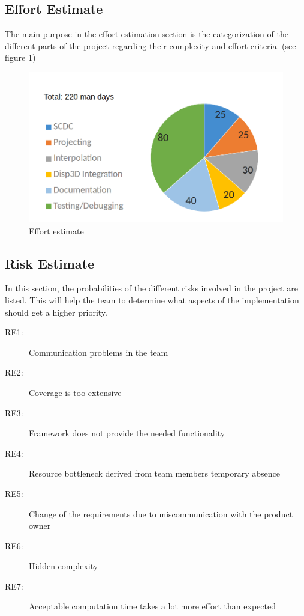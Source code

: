 \newpage

\subsection{Effort Estimate}
The main purpose in the effort estimation section is the categorization of the different parts of the project regarding their complexity and effort criteria.  
 (see figure 1)

\begin{figure}[h]
	\begin{center}
		\includegraphics[width= 14cm]{figures/aufwandsabschaetzung.png}
		\caption{Effort estimate}
	\end{center}
\end{figure}

\clearpage

\subsection{Risk Estimate}
In this section, the probabilities of the different risks involved in the project are listed. This will help the team to determine what aspects of the implementation should get a higher priority.

\begin{description}
	\item[RE1:] Communication problems in the team
	\item[RE2:] Coverage is too extensive
	\item[RE3:] Framework does not provide the needed functionality 
	\item[RE4:] Resource bottleneck derived from team members temporary absence 
	\item[RE5:] Change of the requirements due to miscommunication with the product owner 
	\item[RE6:] Hidden complexity 
	\item[RE7:] Acceptable computation time takes a lot more effort than expected  
\end{description}

